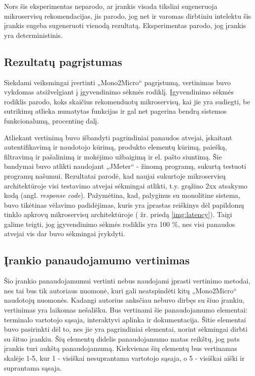 \documentclass{VUMIFPSbakalaurinis}
\begin{document}
Nors šis eksperimentas neparodo, ar įrankis visada tiksliai sugeneruoja mikroservisų rekomendacijas, jis parodo, jog net ir varomas dirbtiniu intelektu šis įrankis sugeba sugeneruoti vienodą rezultatą. Eksperimentas parodo, jog įrankis yra deterministinis.

\subsection{Rezultatų pagrįstumas}
Siekdami veiksmingai įvertinti „Mono2Micro“ pagrįstumą, vertinimas buvo vykdomas atsižvelgiant į įgyvendinimo sėkmės rodiklį. Įgyvendinimo sėkmės rodiklis parodo, koks skaičius rekomenduotų mikroservisų, kai jie yra sudiegti, be sutrikimų atlieka numatytas funkcijas ir gal net pagerina bendrą sistemos funkcionalumą, procentinę dalį.

Atliekant vertinimą buvo išbandyti pagrindiniai panaudos atvejai, įskaitant autentifikavimą ir naudotojo kūrimą, produkto elementų kūrimą, paiešką, filtravimą ir pašalinimą ir mokėjimo užbaigimą ir el. pašto siuntimą. Šie bandymai buvo atlikti naudojant „JMeter“ - žinomą programą, sukurtą testuoti programų našumui. Rezultatai parodė, kad naujai sukurtoje mikroservisų architektūroje visi testavimo atvejai sėkmingai atlikti, t.y. grąžino 2xx atsakymo kodą (angl. \emph{response code}). Pažymėtina, kad, palyginus su monolitine sistema, buvo tikėtinas vėlavimo padidėjimas, kuris yra įprastas reiškinys dėl papildomų tinklo apkrovų mikroservisų architektūroje ( žr. priedą \ref{img:latency}). Taigi galime teigti, jog įgyvendinimo sėkmės rodiklis yra 100 \%, nes visi panaudos atvejai vis dar buvo sėkmingai įvykdyti.

\subsection{Įrankio panaudojamumo vertinimas}
Šio įrankio panaudojamumui vertinti nebus naudojami įprasti vertinimo metodai, nes tai bus tik autoriaus nuomonė, kuri gali neatspindėti kitų „Mono2Micro“ naudotojų nuomonės. Kadangi autorius anksčiau nebuvo dirbęs su šiuo įrankiu, vertinimas yra laikomas nešališku. Bus vertinami šie panaudojamumo elementai: terminalo vartotojo sąsaja, interaktyvi aplinka ir dokumentacija. Šitie elementai buvo pasirinkti dėl to, nes jie yra pagrindiniai elementai, norint sėkmingai dirbti su šituo įrankiu. Šių elementų didelis panaudojamumo matas reikštų, jog pats įrankis turi aukštą panaudojamumą. Kiekvienas šių elementų bus vertinamas skalėje 1-5, kur 1 - visiškai nesuprantama vartotojo sąsaja, o 5 - visiškai aiški ir suprantama sąsaja.
\end{document}
